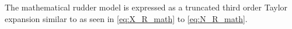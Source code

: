 The mathematical rudder model is expressed as a truncated third order Taylor expansion similar to \citet{abkowitz_ship_1964} as seen in \autoref{eq:X_R_math} to \autoref{eq:N_R_math}.
\begin{equation}
    \label{eq:X_R_math}
    
\end{equation}
%
\begin{equation}
    \label{eq:Y_R_math}
    
\end{equation}
%
\begin{equation}
    \label{eq:N_R_math}
    
\end{equation}